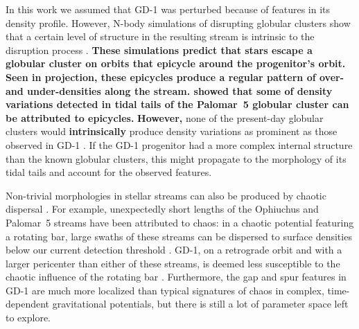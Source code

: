 \documentclass[twocolumn]{aastex62}
\newcommand{\changes}[1]{{\textbf{#1}}}
\begin{document}
In this work we assumed that GD-1 was perturbed because of features in its density profile.
However, N-body simulations of disrupting globular clusters show that a certain level of structure in the resulting stream is intrinsic to the disruption process \citep[e.g.,][]{kupper2008,kupper2010}.
\changes{These simulations predict that stars escape a globular cluster on orbits that epicycle around the progenitor's orbit.
Seen in projection, these epicycles produce a regular pattern of over- and under-densities along the stream.
\citet{kupper2015} showed that some of density variations detected in tidal tails of the Palomar~5 globular cluster can be attributed to epicycles.
}
\changes{However,} none of the present-day globular clusters would \changes{intrinsically} produce density variations as prominent as those observed in GD-1 \citep[see][]{pwb}.
If the GD-1 progenitor had a more complex internal structure than the known globular clusters, this might propagate to the morphology of its tidal tails and account for the observed features.

Non-trivial morphologies in stellar streams can also be produced by chaotic dispersal \citep{pw2016}.
For example, unexpectedly short lengths of the Ophiuchus and Palomar~5 streams have been attributed to chaos: in a chaotic potential featuring a rotating bar, large swaths of these streams can be dispersed to surface densities below our current detection threshold \citep{pw2016b,pearson2017}.
GD-1, on a retrograde orbit and with a larger pericenter than either of these streams, is deemed less susceptible to the chaotic influence of the rotating bar \citep{bb2018}.
Furthermore, the gap and spur features in GD-1 are much more localized than typical signatures of chaos in complex, time-dependent gravitational potentials, but there is still a lot of parameter space left to explore.
\end{document}
